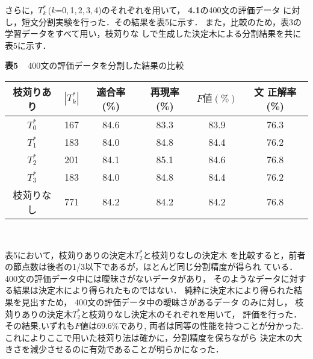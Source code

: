 さらに，$T_k^*$\,($k$=0,\,1,\,2,\,3,\,4)のそれぞれを用いて，
{\bf 4.1}の400文の評価データ
に対し，短文分割実験を行った．その結果を表5に示す．
また，比較のため，表3の学習データをすべて用い，枝苅りな
しで生成した決定木による分割結果を共に表5に示す．
\begin{table}[t]
\begin{center}
{\bf 表5\ \ }400文の評価データを分割した結果の比較
\vspace*{1mm}\\
\hspace*{-10mm}\begin{tabular}{|c|c|c|c|c|c|}
\hline
枝苅りあり &$|T_k^*|$&適合率(\%)&再現率(\%)& $F値(\%)$ &文
正解率(\%)\\ \hline
$T_0^*$ &167& 84.6 &  83.3&83.9 &76.3\\
\hline
$T_1^*$ & 183&84.0 & 84.8 &84.4 & 76.2\\
\hline
$T_2^*$ & 201&84.1& 85.1 &84.6 & 76.8\\
\hline
$T_3^*$ &183& 84.0& 84.8&84.4 &76.2\\
\hline
\hline
枝苅りなし & 771&84.2& 84.2 &84.2 & 76.8\\
\hline
\end{tabular}
\vspace*{1mm}\\
\end{center}
\end{table}

表5において，枝苅りありの決定木$T_2^*$と枝苅りなしの決定木
を比較すると，前者の節点数は後者の1/3以下であるが，ほとんど同じ分割精度が得られ
ている．400文の評価データ中には曖昧さがないデータがあり，
そのようなデータに対する結果は決定木により得られたものではない．
純粋に決定木により得られた結果を見出すため，
400文の評価データ中の曖昧さがあるデータ
のみに対し，
枝苅りありの決定木$T_2^*$と枝苅りなし決定木のそれぞれを用いて，
評価を行った．その結果,いずれも$F$値は$69.6\%$であり,
両者は同等の性能を持つことが分かった.
これによりここで用いた枝苅り法は確かに，分割精度を保ちながら
決定木の大きさを減少させるのに有効であることが明らかになった．
